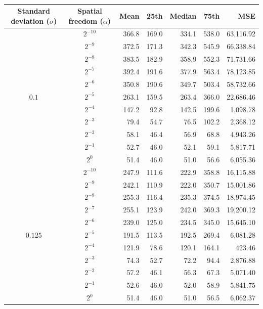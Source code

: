 \begin{table}[H]
    \centering
    \footnotesize
    \caption{}
    \label{tab:degree-statistics-fitting}
    \begin{tabular}{ccrrrrr}
        \toprule
        Standard deviation ($\sigma$) &
        Spatial freedom ($\alpha$) &
        Mean &
        25th &
        Median &
        75th &
        MSE \\
        \midrule
\multirow{11}{*}{$ 0.1 $} & $2^{-10}$ & 366.8 & 169.0 & 334.1 & 538.0 & 63,116.92 \\
 & $2^{-9}$ & 372.5 & 171.3 & 342.3 & 545.9 & 66,338.84 \\
 & $2^{-8}$ & 383.5 & 182.9 & 358.9 & 552.3 & 71,731.66 \\
 & $2^{-7}$ & 392.4 & 191.6 & 377.9 & 563.4 & 78,123.85 \\
 & $2^{-6}$ & 350.8 & 190.6 & 349.7 & 503.4 & 58,732.66 \\
 & $2^{-5}$ & 263.1 & 159.5 & 263.4 & 366.0 & 22,686.46 \\
 & $2^{-4}$ & 147.2 & 92.8 & 142.5 & 199.6 & 1,098.78 \\
 & $2^{-3}$ & 79.4 & 54.7 & 76.5 & 102.2 & 2,368.12 \\
 & $2^{-2}$ & 58.1 & 46.4 & 56.9 & 68.8 & 4,943.26 \\
 & $2^{-1}$ & 52.7 & 46.0 & 52.1 & 59.1 & 5,817.71 \\
 & $2^{0}$ & 51.4 & 46.0 & 51.0 & 56.6 & 6,055.36 \\
\midrule
\multirow{11}{*}{$ 0.125 $} & $2^{-10}$ & 247.9 & 111.6 & 222.9 & 358.8 & 16,115.88 \\
 & $2^{-9}$ & 242.1 & 110.9 & 222.0 & 350.7 & 15,001.86 \\
 & $2^{-8}$ & 255.3 & 116.4 & 235.3 & 374.5 & 18,974.45 \\
 & $2^{-7}$ & 255.1 & 123.9 & 242.0 & 369.3 & 19,200.12 \\
 & $2^{-6}$ & 239.0 & 125.0 & 234.5 & 345.0 & 15,645.10 \\
 & $2^{-5}$ & 191.5 & 113.5 & 192.5 & 269.4 & 6,081.28 \\
 & $2^{-4}$ & 121.9 & 78.6 & 120.1 & 164.1 & 423.46 \\
 & $2^{-3}$ & 74.3 & 52.7 & 72.2 & 94.4 & 2,876.88 \\
 & $2^{-2}$ & 57.2 & 46.1 & 56.3 & 67.3 & 5,071.40 \\
 & $2^{-1}$ & 52.6 & 46.0 & 52.0 & 58.9 & 5,841.75 \\
 & $2^{0}$ & 51.4 & 46.0 & 51.0 & 56.5 & 6,062.37 \\

\end{tabular}
\end{table}
